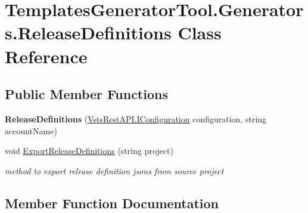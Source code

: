 \hypertarget{class_templates_generator_tool_1_1_generators_1_1_release_definitions}{}\section{Templates\+Generator\+Tool.\+Generators.\+Release\+Definitions Class Reference}
\label{class_templates_generator_tool_1_1_generators_1_1_release_definitions}
\subsection*{Public Member Functions}
\begin{DoxyCompactItemize}
\item 
\mbox{\label{class_templates_generator_tool_1_1_generators_1_1_release_definitions_a71468dc455e8addf7ecf4ad84e2526f2}} 
{\bfseries Release\+Definitions} (\mbox{\hyperlink{interface_vsts_rest_a_p_i_1_1_i_configuration}{Vsts\+Rest\+A\+P\+I.\+I\+Configuration}} configuration, string account\+Name)
\item 
void \mbox{\hyperlink{class_templates_generator_tool_1_1_generators_1_1_release_definitions_a3660f90a0a356fdf82aee0373f7e2941}{Export\+Release\+Definitions}} (string project)
\begin{DoxyCompactList}\small\item\em method to export release definition jsons from source project \end{DoxyCompactList}\end{DoxyCompactItemize}


\subsection{Member Function Documentation}
\mbox{\label{class_templates_generator_tool_1_1_generators_1_1_release_definitions_a3660f90a0a356fdf82aee0373f7e2941}} 
